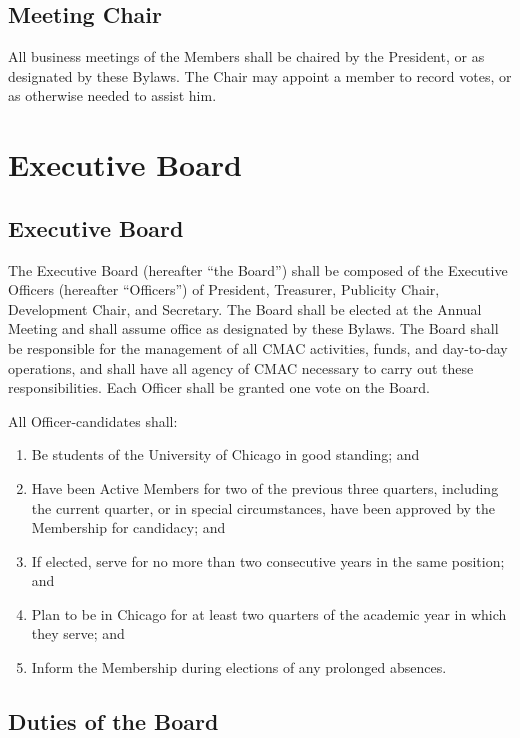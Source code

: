 \documentclass{article}
\begin{document}
\subsection{Meeting Chair}

All business meetings of the Members shall be chaired by the President,
or as designated by these Bylaws. The Chair may appoint a member to
record votes, or as otherwise needed to assist him.

\section{Executive Board} \label{board}
\subsection{Executive Board}

The Executive Board (hereafter ``the Board'') shall be composed of the Executive
Officers (hereafter ``Officers'') of President, Treasurer, Publicity Chair,
Development Chair, and Secretary. The Board shall be elected at the Annual
Meeting and shall assume office as designated by these Bylaws. The Board shall
be responsible for the management of all CMAC activities, funds, and day-to-day
operations, and shall have all agency of CMAC necessary to carry out these
responsibilities. Each Officer shall be granted one vote on the Board.

All Officer-candidates shall:
\begin{enumerate}
\item Be students of the University of Chicago in good standing;
and
\item Have been Active Members for two of the previous three quarters, including
the current quarter, or in special circumstances, have been approved
by the Membership for candidacy; and
\item If elected, serve for no more than two consecutive years in the same
position; and
\item Plan to be in Chicago for at least two quarters of the academic year
in which they serve; and
\item Inform the Membership during elections of any prolonged absences.
\end{enumerate}

\subsection{Duties of the Board}
\end{document}

